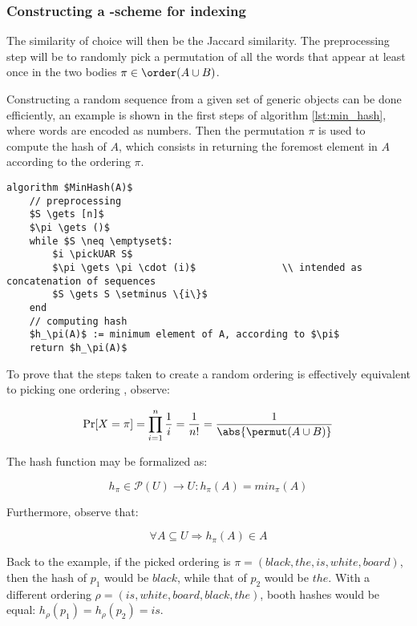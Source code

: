 \subsubsection{Constructing a \lsh-scheme for indexing}

The similarity of choice will then be the Jaccard similarity. The preprocessing step will be to randomly pick a permutation of all the words that appear at least once in the two bodies $\pi \in \order(A \cup B)$.

Constructing a random sequence from a given set of generic objects can be done efficiently, an example is shown in the first steps of algorithm \ref{lst:min_hash}, where words are encoded as numbers. Then the permutation $\pi$ is used to compute the hash of $A$, which consists in returning the foremost element in $A$ according to the ordering $\pi$.

\begin{lstlisting}[caption = {min hash or shingles algorithm}, label = {lst:min_hash}]
algorithm $MinHash(A)$
    // preprocessing
    $S \gets [n]$
    $\pi \gets ()$
    while $S \neq \emptyset$:
        $i \pickUAR S$
        $\pi \gets \pi \cdot (i)$               \\ intended as concatenation of sequences
        $S \gets S \setminus \{i\}$
    end
    // computing hash
    $h_\pi(A)$ := minimum element of A, according to $\pi$
    return $h_\pi(A)$
\end{lstlisting}

To prove that the steps taken to create a random ordering is effectively equivalent to picking one ordering \uar{}, observe:

\[
    \Pr[X = \pi] = \prod_{i = 1}^n \frac{1}{i} = \frac{1}{n!} = \frac{1}{\abs{\permut(A \cup B)}}
\]

The hash function may be formalized as:

\begin{equation}
    h_\pi \in \mathcal{P}(U) \to U : h_\pi(A) = min_\pi(A)
\end{equation}

Furthermore, observe that:

\[
    \forall A \subseteq U \Rightarrow h_\pi(A) \in A
\]

Back to the example, if the picked ordering is $\pi = (black, the, is, white, board)$, then the hash of $p_1$ would be $black$, while that of $p_2$ would be $the$. With a different ordering $\rho = (is, white, board, black, the)$, booth hashes would be equal: $h_\rho(p_1) = h_\rho(p_2) = is$.

